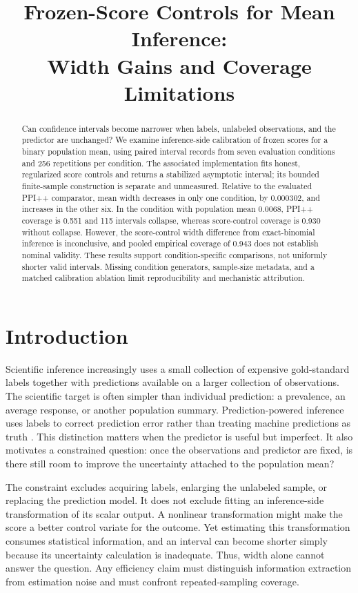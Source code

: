 \documentclass{article}
\title{Frozen-Score Controls for Mean Inference:\\Width Gains and Coverage Limitations}
\author{}
\begin{document}
\maketitle

\begin{abstract}
Can confidence intervals become narrower when labels, unlabeled observations, and the predictor are unchanged? We examine inference-side calibration of frozen scores for a binary population mean, using paired interval records from seven evaluation conditions and 256 repetitions per condition. The associated implementation fits honest, regularized score controls and returns a stabilized asymptotic interval; its bounded finite-sample construction is separate and unmeasured. Relative to the evaluated PPI++ comparator, mean width decreases in only one condition, by 0.000302, and increases in the other six. In the condition with population mean 0.0068, PPI++ coverage is 0.551 and 115 intervals collapse, whereas score-control coverage is 0.930 without collapse. However, the score-control width difference from exact-binomial inference is inconclusive, and pooled empirical coverage of 0.943 does not establish nominal validity. These results support condition-specific comparisons, not uniformly shorter valid intervals. Missing condition generators, sample-size metadata, and a matched calibration ablation limit reproducibility and mechanistic attribution.
\end{abstract}

\section{Introduction}
Scientific inference increasingly uses a small collection of expensive gold-standard labels together with predictions available on a larger collection of observations. The scientific target is often simpler than individual prediction: a prevalence, an average response, or another population summary. Prediction-powered inference uses labels to correct prediction error rather than treating machine predictions as truth \citep{Angelopoulos2023PPI}. This distinction matters when the predictor is useful but imperfect. It also motivates a constrained question: once the observations and predictor are fixed, is there still room to improve the uncertainty attached to the population mean?

The constraint excludes acquiring labels, enlarging the unlabeled sample, or replacing the prediction model. It does not exclude fitting an inference-side transformation of its scalar output. A nonlinear transformation might make the score a better control variate for the outcome. Yet estimating this transformation consumes statistical information, and an interval can become shorter simply because its uncertainty calculation is inadequate. Thus, width alone cannot answer the question. Any efficiency claim must distinguish information extraction from estimation noise and must confront repeated-sampling coverage.
\end{document}
